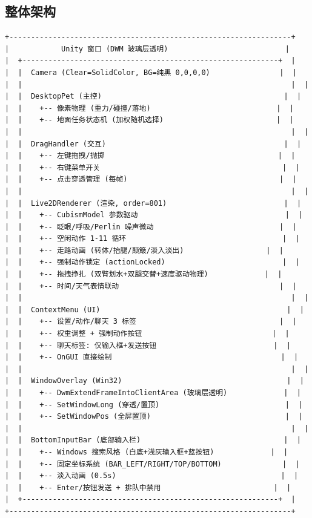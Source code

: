 \documentclass[12pt,a4paper]{ctexart}
\begin{document}
\subsection{整体架构}

\begin{lstlisting}[frame=single,numbers=none,style=csharp]
+-----------------------------------------------------------------+
|            Unity 窗口 (DWM 玻璃层透明)                           |
|  +-----------------------------------------------------------+  |
|  |  Camera (Clear=SolidColor, BG=纯黑 0,0,0,0)                |  |
|  |                                                              |  |
|  |  DesktopPet (主控)                                          |  |
|  |    +-- 像素物理 (重力/碰撞/落地)                             |  |
|  |    +-- 地面任务状态机 (加权随机选择)                          |  |
|  |                                                              |  |
|  |  DragHandler (交互)                                         |  |
|  |    +-- 左键拖拽/抛掷                                        |  |
|  |    +-- 右键菜单开关                                          |  |
|  |    +-- 点击穿透管理 (每帧)                                   |  |
|  |                                                              |  |
|  |  Live2DRenderer (渲染, order=801)                           |  |
|  |    +-- CubismModel 参数驱动                                  |  |
|  |    +-- 眨眼/呼吸/Perlin 噪声微动                             |  |
|  |    +-- 空闲动作 1-11 循环                                    |  |
|  |    +-- 走路动画 (转体/抬腿/颠簸/淡入淡出)                   |  |
|  |    +-- 强制动作锁定 (actionLocked)                           |  |
|  |    +-- 拖拽挣扎 (双臂划水+双腿交替+速度驱动物理)             |  |
|  |    +-- 时间/天气表情联动                                     |  |
|  |                                                              |  |
|  |  ContextMenu (UI)                                           |  |
|  |    +-- 设置/动作/聊天 3 标签                                 |  |
|  |    +-- 权重调整 + 强制动作按钮                              |  |
|  |    +-- 聊天标签: 仅输入框+发送按钮                           |  |
|  |    +-- OnGUI 直接绘制                                       |  |
|  |                                                              |  |
|  |  WindowOverlay (Win32)                                      |  |
|  |    +-- DwmExtendFrameIntoClientArea (玻璃层透明)             |  |
|  |    +-- SetWindowLong (穿透/置顶)                             |  |
|  |    +-- SetWindowPos (全屏置顶)                               |  |
|  |                                                              |  |
|  |  BottomInputBar (底部输入栏)                                 |  |
|  |    +-- Windows 搜索风格 (白底+浅灰输入框+蓝按钮)             |  |
|  |    +-- 固定坐标系统 (BAR_LEFT/RIGHT/TOP/BOTTOM)              |  |
|  |    +-- 淡入动画 (0.5s)                                      |  |
|  |    +-- Enter/按钮发送 + 排队中禁用                          |  |
|  +-----------------------------------------------------------+  |
+-----------------------------------------------------------------+
\end{lstlisting}
\end{document}
